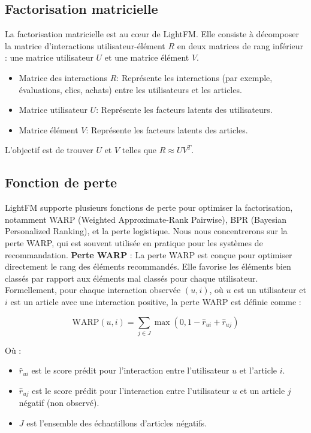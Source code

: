 \documentclass[edit,12pt,a4paper,ChapStyle,oneside,doubleinterligne]{report}
\begin{document}
\subsection{Factorisation matricielle}
La factorisation matricielle est au cœur de LightFM. Elle consiste à décomposer la matrice d'interactions utilisateur-élément \( R \) en deux matrices de rang inférieur :  une matrice utilisateur \( U \) et une matrice élément \( V \).
\begin{itemize}
    \item Matrice des interactions \( R \): Représente les interactions (par exemple, évaluations, clics, achats) entre les utilisateurs et les articles.
    \item Matrice utilisateur \( U \): Représente les facteurs latents des utilisateurs.
    \item Matrice élément \( V \): Représente les facteurs latents des articles.
\end{itemize}
L'objectif est de trouver \( U \) et \( V \) telles que \( R \approx UV^T \).
\subsection{Fonction de perte}
LightFM supporte plusieurs fonctions de perte pour optimiser la factorisation, notamment WARP (Weighted Approximate-Rank Pairwise), BPR (Bayesian Personalized Ranking), et la perte logistique. Nous nous concentrerons sur la perte WARP, qui est souvent utilisée en pratique pour les systèmes de recommandation.
\newline
\textbf{Perte WARP} : 
\newline
La perte WARP est conçue pour optimiser directement le rang des éléments recommandés. Elle favorise les éléments bien classés par rapport aux éléments mal classés pour chaque utilisateur.
\newline
Formellement, pour chaque interaction observée \((u, i)\), où \(u\) est un utilisateur et \(i\) est un article avec une interaction positive, la perte WARP est définie comme : 

\[
\text{WARP}(u, i) = \sum_{j \in J} \max(0, 1 - \hat{r}_{ui} + \hat{r}_{uj})
\]

Où : 

\begin{itemize}
    \item \(\hat{r}_{ui}\) est le score prédit pour l'interaction entre l'utilisateur \(u\) et l'article \(i\).
    \item \(\hat{r}_{uj}\) est le score prédit pour l'interaction entre l'utilisateur \(u\) et un article \(j\) négatif (non observé).
    \item \(J\) est l'ensemble des échantillons d'articles négatifs.
\end{itemize}
\end{document}
